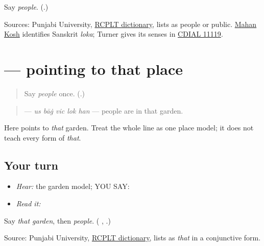 \begin{tcolorbox}[breakable,colback=teal!4,colframe=teal!35!black,title={Before you move on}]
Say \emph{people}. (\textbf{}.)

Sources: Punjabi University, \href{https://dic.learnpunjabi.org/default.aspx?look=\%E0\%A8\%B2\%E0\%A9\%8B\%E0\%A8\%95}{RCPLT dictionary}, lists \textbf{} as people or public. \href{https://punjabi.com/dictionary/wordmeaning?script=roman\&search=\%E0\%A8\%B2\%E0\%A9\%8B\%E0\%A8\%95}{Mahan Kosh} identifies Sanskrit \emph{loka}; Turner gives its senses in \href{https://dsal.uchicago.edu/dictionaries/soas/}{CDIAL 11119}.
\end{tcolorbox}
\section[\texorpdfstring{\pa{ਉਸ} (us)}{ਉਸ (us)}]{ — pointing to that place}

\label{lesson:PA-C180-us}



\begin{quote}
Say \emph{people} once. (\textbf{}.)
\end{quote}

\begin{grammarlens}[title={Grammar Lens: one pointing word}]
\begin{quote}
\textbf{    } — \emph{us bāġ vic lok han} — people are in that garden.
\end{quote}

Here \textbf{} points to \emph{that} garden. Treat the whole line as one place model; it does not teach every form of \emph{that}.
\end{grammarlens}

\subsection*{Your turn}
\begin{itemize}
\raggedright
  \item \emph{Hear:} the garden model; YOU SAY: \textbf{    }
  \item \emph{Read it:} \textbf{    }
\end{itemize}

\begin{tcolorbox}[breakable,colback=teal!4,colframe=teal!35!black,title={Before you move on}]
Say \emph{that garden}, then \emph{people}. (\textbf{ }, \textbf{}.)

Source: Punjabi University, \href{https://dic.learnpunjabi.org/default.aspx?look=\%E0\%A8\%89\%E0\%A8\%B8}{RCPLT dictionary}, lists \textbf{} as \emph{that} in a conjunctive form.
\end{tcolorbox}
